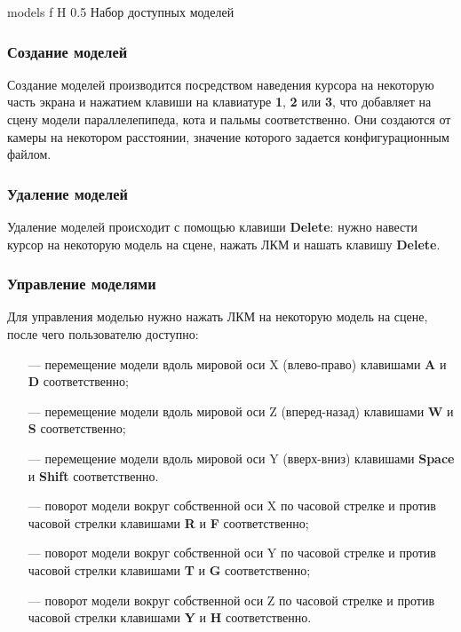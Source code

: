 {models}
{f}
{H}
{0.5\textwidth}
{Набор доступных моделей}

\subsubsection*{Создание моделей}

Создание моделей производится посредством наведения курсора на некоторую часть экрана и нажатием клавиши на клавиатуре \textbf{1}, \textbf{2} или \textbf{3}, что добавляет на сцену модели параллелепипеда, кота и пальмы соответственно. Они создаются от камеры на некотором расстоянии, значение которого задается конфигурационным файлом.

\subsubsection*{Удаление моделей}

Удаление моделей происходит с помощью клавиши \textbf{Delete}: нужно навести курсор на некоторую модель на сцене, нажать ЛКМ и нашать клавишу \textbf{Delete}.

\subsubsection*{Управление моделями}

Для управления моделью нужно нажать ЛКМ на некоторую модель на сцене, после чего пользователю доступно:

\begin{itemize}
	\item[---] перемещение модели вдоль мировой оси X (влево-право) клавишами \textbf{A} и \textbf{D} соответственно;
	\item[---] перемещение модели вдоль мировой оси Z (вперед-назад) клавишами \textbf{W} и \textbf{S} соответственно;
	\item[---] перемещение модели вдоль мировой оси Y (вверх-вниз) клавишами \textbf{Space} и \textbf{Shift} соответственно.
	\item[---] поворот модели вокруг собственной оси X по часовой стрелке и против часовой стрелки клавишами \textbf{R} и \textbf{F} соответственно;
	\item[---] поворот модели вокруг собственной оси Y по часовой стрелке и против часовой стрелки клавишами \textbf{T} и \textbf{G} соответственно;
	\item[---] поворот модели вокруг собственной оси Z по часовой стрелке и против часовой стрелки клавишами \textbf{Y} и \textbf{H} соответственно.
\end{itemize}

